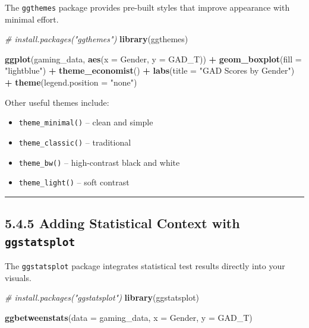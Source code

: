 \documentclass[
]{book}
\newenvironment{Shaded}{\begin{snugshade}}{\end{snugshade}}
\newcommand{\AttributeTok}[1]{\textcolor[rgb]{0.13,0.29,0.53}{#1}}
\newcommand{\CommentTok}[1]{\textcolor[rgb]{0.56,0.35,0.01}{\textit{#1}}}
\newcommand{\FunctionTok}[1]{\textcolor[rgb]{0.13,0.29,0.53}{\textbf{#1}}}
\newcommand{\NormalTok}[1]{#1}
\newcommand{\SpecialCharTok}[1]{\textcolor[rgb]{0.81,0.36,0.00}{\textbf{#1}}}
\newcommand{\StringTok}[1]{\textcolor[rgb]{0.31,0.60,0.02}{#1}}
\providecommand{\tightlist}{%
  \setlength{\itemsep}{0pt}\setlength{\parskip}{0pt}}
\begin{document}
The \texttt{ggthemes} package provides pre-built styles that improve appearance with minimal effort.

\begin{Shaded}
\begin{Highlighting}[]
\CommentTok{\# install.packages("ggthemes")}
\FunctionTok{library}\NormalTok{(ggthemes)}

\FunctionTok{ggplot}\NormalTok{(gaming\_data, }\FunctionTok{aes}\NormalTok{(}\AttributeTok{x =}\NormalTok{ Gender, }\AttributeTok{y =}\NormalTok{ GAD\_T)) }\SpecialCharTok{+}
  \FunctionTok{geom\_boxplot}\NormalTok{(}\AttributeTok{fill =} \StringTok{"lightblue"}\NormalTok{) }\SpecialCharTok{+}
  \FunctionTok{theme\_economist}\NormalTok{() }\SpecialCharTok{+}
  \FunctionTok{labs}\NormalTok{(}\AttributeTok{title =} \StringTok{"GAD Scores by Gender"}\NormalTok{) }\SpecialCharTok{+}
  \FunctionTok{theme}\NormalTok{(}\AttributeTok{legend.position =} \StringTok{"none"}\NormalTok{)}
\end{Highlighting}
\end{Shaded}

Other useful themes include:

\begin{itemize}
\tightlist
\item
  \texttt{theme\_minimal()} -- clean and simple
\item
  \texttt{theme\_classic()} -- traditional
\item
  \texttt{theme\_bw()} -- high-contrast black and white
\item
  \texttt{theme\_light()} -- soft contrast
\end{itemize}

\begin{center}\rule{0.5\linewidth}{0.5pt}\end{center}

\subsection{\texorpdfstring{5.4.5 Adding Statistical Context with \texttt{ggstatsplot}}{5.4.5 Adding Statistical Context with ggstatsplot}}\label{adding-statistical-context-with-ggstatsplot}

The \texttt{ggstatsplot} package integrates statistical test results directly into your visuals.

\begin{Shaded}
\begin{Highlighting}[]
\CommentTok{\# install.packages("ggstatsplot")}
\FunctionTok{library}\NormalTok{(ggstatsplot)}

\FunctionTok{ggbetweenstats}\NormalTok{(}\AttributeTok{data =}\NormalTok{ gaming\_data, }\AttributeTok{x =}\NormalTok{ Gender, }\AttributeTok{y =}\NormalTok{ GAD\_T)}
\end{Highlighting}
\end{Shaded}
\end{document}
